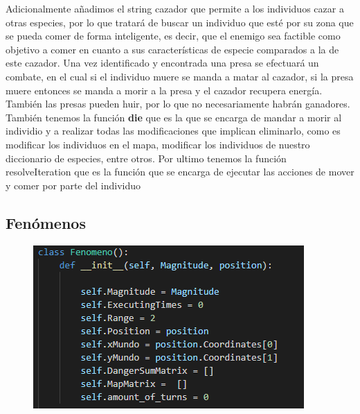 \documentclass{llncs}
\begin{document}
\newline
Adicionalmente añadimos el string cazador que permite a los individuos cazar a otras especies, por lo que tratará de buscar un individuo que esté por su zona que se pueda comer de forma inteligente, es decir, que el enemigo sea factible como objetivo a comer en cuanto a sus características de especie comparados a la de este cazador.
\newline
Una vez identificado y encontrada una presa se efectuará un combate, en el cual si el individuo muere se manda a matar al cazador, si la presa muere entonces se manda a morir a la presa y el cazador recupera energía. También las presas pueden huir, por lo que no necesariamente habrán ganadores.
\newline
\newline
También tenemos la función \textbf{die} que es la que se encarga de mandar a morir al individio y a realizar todas las modificaciones que implican eliminarlo, como es modificar los individuos en el mapa, modificar los individuos de nuestro diccionario de especies, entre otros.
\newline
\newline
Por ultimo tenemos la función resolveIteration que es la función que se encarga de ejecutar las acciones de mover y comer por parte del individuo
 

\subsection{Fenómenos}
\begin{figure}
	\centering
	\includegraphics[width=0.7\linewidth]{imagenes/fenomeno}
	\label{fig:fenomeno}
\end{figure}
\end{document}
